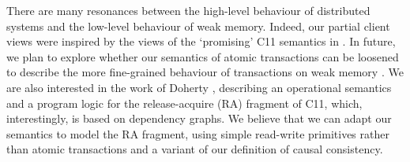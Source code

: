 There are many resonances between the high-level  behaviour
of distributed systems and the low-level behaviour  of weak
memory. Indeed, our partial client views were 
inspired by the views of  the `promising' C11 semantics in \cite{promises}. 
In future, we plan to explore whether our semantics of atomic transactions can be loosened to describe the more fine-grained behaviour of transactions on weak
memory \cite{PSI-RA,SI-RA,DBLP:conf/pldi/ChongSW18}. 
We are also interested in the work of Doherty \etal\citet{op-semantics-c11-rar}, describing an
operational semantics and a program logic for the release-acquire (RA) fragment of C11, which, interestingly, 
is based on dependency graphs. 
We believe that we can adapt our semantics to model the RA fragment, using simple read-write
primitives rather than atomic transactions and a variant of our definition of causal consistency.%
